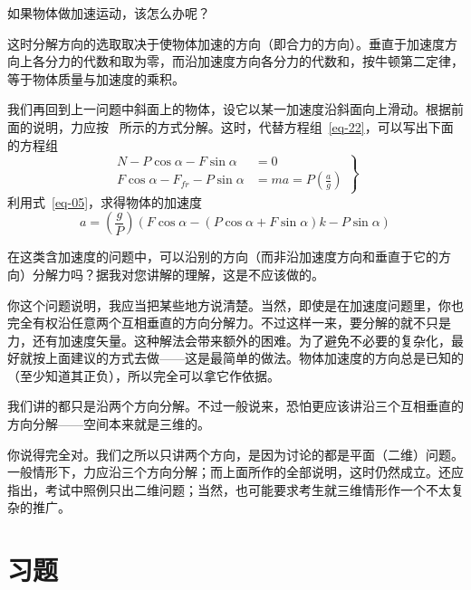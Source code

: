 \begin{dialogue}
\std 如果物体做加速运动，该怎么办呢？

\tchr 这时分解方向的选取取决于使物体加速的方向（即合力的方向）。垂直于加速度方向上各分力的代数和取为零，而沿加速度方向各分力的代数和，按牛顿第二定律，等于物体质量与加速度的乘积。

我们再回到上一问题中斜面上的物体，设它以某一加速度沿斜面向上滑动。根据前面的说明，力应按~ 所示的方式分解。这时，代替方程组~\eqref{eq-22}，可以写出下面的方程组
\begin{equation}%
\left.
\begin{aligned}
N  - P \cos \alpha -F \sin \alpha & = 0 \\
F \cos \alpha - F_{fr} - P \sin \alpha & = ma = P \left( \frac{a}{g} \right)
\label{eq-23}
\end{aligned}
\right\}
\end{equation}
利用式~\eqref{eq-05}，求得物体的加速度
\begin{equation*}%
a = \left( \frac{g}{P} \right) \left(F \cos \alpha - \left(P \cos \alpha + F \sin \alpha \right) k - P \sin \alpha \right)
\end{equation*}

\std 在这类含加速度的问题中，可以沿别的方向（而非沿加速度方向和垂直于它的方向）分解力吗？据我对您讲解的理解，这是不应该做的。

\tchr 你这个问题说明，我应当把某些地方说清楚。当然，即使是在加速度问题里，你也完全有权沿任意两个互相垂直的方向分解力。不过这样一来，要分解的就不只是力，还有加速度矢量。这种解法会带来额外的困难。为了避免不必要的复杂化，最好就按上面建议的方式去做——这是最简单的做法。物体加速度的方向总是已知的（至少知道其正负），所以完全可以拿它作依据。

\std 我们讲的都只是沿两个方向分解。不过一般说来，恐怕更应该讲沿三个互相垂直的方向分解——空间本来就是三维的。

\tchr 你说得完全对。我们之所以只讲两个方向，是因为讨论的都是平面（二维）问题。一般情形下，力应沿三个方向分解；而上面所作的全部说明，这时仍然成立。还应指出，考试中照例只出二维问题；当然，也可能要求考生就三维情形作一个不太复杂的推广。

\end{dialogue}

\section*{习题}
\label{prob-02}

